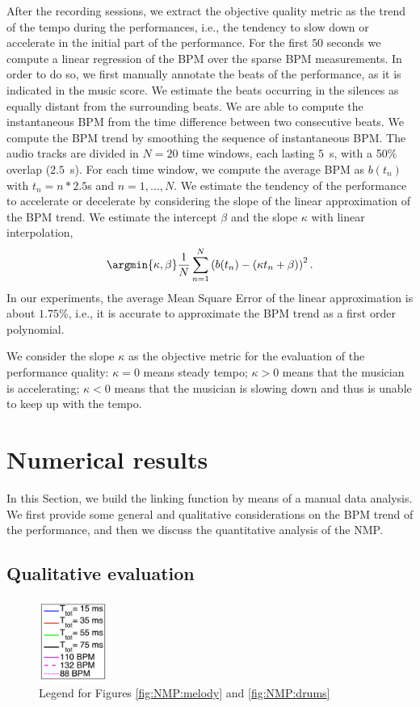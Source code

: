 After the recording sessions, we extract the objective quality metric as the trend of the tempo during the performances, i.e., the tendency to slow down or accelerate in the initial part of the performance. For the first $50$ seconds we compute a linear regression of the BPM over the sparse BPM measurements. In order to do so, we first manually annotate the beats of the performance, as it is indicated in the music score. We estimate the beats occurring in the silences as equally distant from the surrounding beats. We are able to compute the instantaneous BPM from the time difference between two consecutive beats. We compute the BPM trend by smoothing the sequence of instantaneous BPM. The audio tracks are divided in $N=20$ time windows, each lasting $5$~s, with a 50\% overlap ($2.5$~s). For each time window, we compute the average BPM as $b(t_n)$ with $t_n=n*2.5$s and $n=1,...,N$. We estimate the tendency of the performance to accelerate or decelerate by considering the slope of the linear approximation of the BPM trend. We estimate the intercept $\beta$ and the slope $\kappa$ with linear interpolation, 
\begin{equation}
\argmin{\kappa, \beta} \frac{1}{N} \sum_{n=1}^{N} \left(b(t_n)-(\kappa t_n + \beta)\right)^2.
\end{equation}
In our experiments, the average Mean Square Error of the linear approximation is about $1.75$\%, i.e., it is accurate to approximate the BPM trend as a first order polynomial.

We consider the slope $\kappa$ as the objective metric for the evaluation of the performance quality: $\kappa=0$ means steady tempo; $\kappa>0$ means that the musician is accelerating; $\kappa<0$ means that the musician is slowing down and thus is unable to keep up with the tempo. 

\section{Numerical results}\label{sec:NMP:results}
In this Section, we build the linking function by means of a manual data analysis. We first provide some general and qualitative considerations on the BPM trend of the performance, and then we discuss the quantitative analysis of the NMP.

\subsection{Qualitative evaluation}
\begin{figure}
  \begin{center}
     \includegraphics[width=0.2\textwidth]{img/NMP/legend_smaller}
  \end{center}
  \caption{Legend for Figures \ref{fig:NMP:melody} and \ref{fig:NMP:drums} }
 \label{fig:NMP:legend} 
\end{figure}

